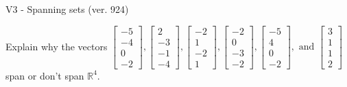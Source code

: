 \begin{exercise}
  \begin{exerciseTitle}V3 - Spanning sets (ver. 924)\end{exerciseTitle}
  \begin{exerciseStatement}
    Explain why the vectors \(\left[\begin{array}{r}
-5 \\
-4 \\
0 \\
-2
\end{array}\right] , \left[\begin{array}{r}
2 \\
-3 \\
-1 \\
-4
\end{array}\right] , \left[\begin{array}{r}
-2 \\
1 \\
-2 \\
1
\end{array}\right] , \left[\begin{array}{r}
-2 \\
0 \\
-3 \\
-2
\end{array}\right] , \left[\begin{array}{r}
-5 \\
4 \\
0 \\
-2
\end{array}\right] , \text{ and } \left[\begin{array}{r}
3 \\
1 \\
1 \\
2
\end{array}\right]\) span or don't span \(\mathbb{R}^4\). 
	



\end{exerciseStatement}
\end{exercise}

